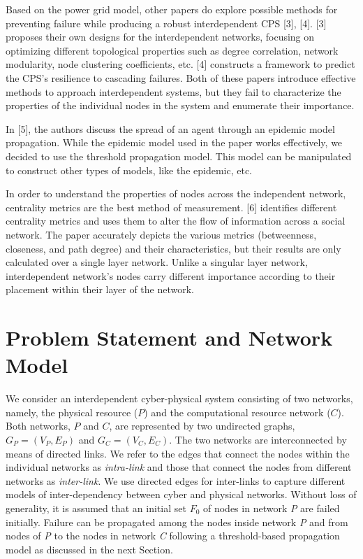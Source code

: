 \documentclass[letterpaper, 10 pt, conference]{ieeeconf}  %
\begin{document}
Based on the power grid model, other papers do explore possible methods for preventing failure while producing a robust interdependent CPS [3], [4]. [3] proposes their own designs for the interdependent networks, focusing on optimizing different topological properties such as degree correlation, network modularity, node clustering coefficients, etc. [4] constructs a framework to predict the CPS’s resilience to cascading failures. Both of these papers introduce effective methods to approach interdependent systems, but they fail to characterize the properties of the individual nodes in the system and enumerate their importance.

In [5], the authors discuss the spread of an agent through an epidemic model propagation. While the epidemic model used in the paper works effectively, we decided to use the threshold propagation model. This model can be manipulated to construct other types of models, like the epidemic, etc.

In order to understand the properties of nodes across the independent network, centrality metrics are the best method of measurement. [6] identifies different centrality metrics and uses them to alter the flow of information across a social network. The paper accurately depicts the various metrics (betweenness, closeness, and path degree) and their characteristics, but their results are only calculated over a single layer network. Unlike a singular layer network, interdependent network’s nodes carry different importance according to their placement within their layer of the network.

\section{Problem Statement and Network Model}
We consider an interdependent cyber-physical system consisting of two networks, namely, the physical resource ($P$) and the computational resource network ($C$). Both networks, $P$ and $C$, are represented by two undirected graphs, $G_{P}=(V_{P},E_{P})$ and $G_{C}=(V_{C},E_{C})$. The two networks are interconnected by means of directed links. We refer to the edges that connect the nodes within the individual networks as \textit{intra-link} and those that connect the nodes from different networks as \textit{inter-link}. We use directed edges for inter-links to capture different models of inter-dependency between cyber and physical networks. Without loss of generality, it is assumed that an initial set $F_0$ of nodes in network \textit{P} are failed initially. Failure can be propagated among the nodes inside network \textit{P} and from nodes of \textit{P} to the nodes in network \textit{C} following a threshold-based propagation model as discussed in the next Section.
\end{document}
